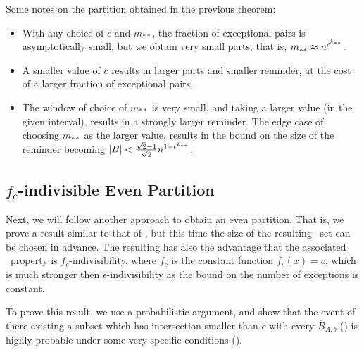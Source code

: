        \begin{remark}
            Some notes on the partition obtained in the previous theorem:
            \begin{itemize}
                \item With any choice of $c$ and $m_{**}$, the fraction of exceptional pairs is asymptotically small,
                    but we obtain very small parts, that is, $m_{**} \thickapprox n^{\epsilon^{k_{**}}}$.
                \item A smaller value of $c$ results in larger parts and smaller reminder, at the cost of a larger fraction
                    of exceptional pairs.
                \item The window of choice of $m_{**}$ is very small, and taking a larger value
                    (in the given interval), results in a strongly larger reminder.
                    The edge case of choosing $m_{**}$ as the larger value, results in the bound on the size of the
                    reminder becoming $| B | < \frac{\sqrt{2}-1}{\sqrt{2}} n^{1-\epsilon^{k_{**}}}$.
            \end{itemize}
        \end{remark}

    \subsection{$f_c$-indivisible Even Partition} \label{subsec:subsection_4.3}

        Next, we will follow another approach to obtain an even partition.
        That is, we prove a result similar to that of , but this time the size of the resulting
        \regular~set can be chosen in advance.
        The resulting  has also the advantage that
        the associated \regular~property is $f_c$-indivisibility, where $f_c$ is the constant function $f_c(x) = c$, which
        is much stronger then $\epsilon$-indivisibility as the bound on the number of exceptions is constant.

        To prove this result, we use a probabilistic argument, and show that the event of there existing a subset which has
        intersection smaller than $c$ with every $\overline{B}_{A,b}$ () is highly
        probable under some very specific conditions ().

